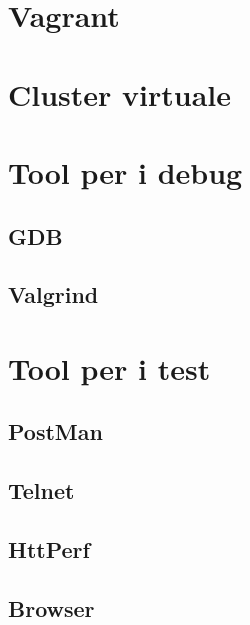 \documentclass[italian]{tktltiki2}
\begin{document}
\section{Vagrant}

\section{Cluster virtuale}

\section{Tool per i debug}
\subsection{GDB}
\subsection{Valgrind}

\section{Tool per i test}
\subsection{PostMan}
\subsection{Telnet}
\subsection{HttPerf}
\subsection{Browser}
\end{document}
